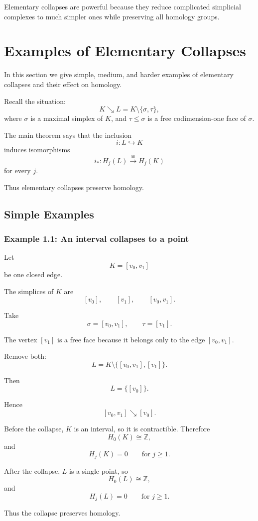 \documentclass[12pt,a4paper]{article}
\theoremstyle{notespace}
\begin{document}
Elementary collapses are powerful because they reduce complicated simplicial complexes to much simpler ones while preserving all homology groups.

\section{Examples of Elementary Collapses}

In this section we give simple, medium, and harder examples of elementary collapses and their effect on homology.

Recall the situation:
\[
K\searrow L=K\setminus\{\sigma,\tau\},
\]
where \(\sigma\) is a maximal simplex of \(K\), and \(\tau\leq \sigma\) is a free codimension-one face of \(\sigma\).

The main theorem says that the inclusion
\[
i\colon L\hookrightarrow K
\]
induces isomorphisms
\[
i_*\colon H_j(L)\xrightarrow{\cong}H_j(K)
\]
for every \(j\).

Thus elementary collapses preserve homology.

\subsection{Simple Examples}

\subsubsection{Example 1.1: An interval collapses to a point}

Let
\[
K=[v_0,v_1]
\]
be one closed edge.

The simplices of \(K\) are
\[
[v_0],\qquad [v_1],\qquad [v_0,v_1].
\]

Take
\[
\sigma=[v_0,v_1],
\qquad
\tau=[v_1].
\]

The vertex \([v_1]\) is a free face because it belongs only to the edge \([v_0,v_1]\).

Remove both:
\[
L=K\setminus\{[v_0,v_1],[v_1]\}.
\]

Then
\[
L=\{[v_0]\}.
\]

Hence
\[
[v_0,v_1]\searrow [v_0].
\]

Before the collapse, \(K\) is an interval, so it is contractible. Therefore
\[
H_0(K)\cong \mathbb Z,
\]
and
\[
H_j(K)=0
\qquad
\text{for }j\geq 1.
\]

After the collapse, \(L\) is a single point, so
\[
H_0(L)\cong \mathbb Z,
\]
and
\[
H_j(L)=0
\qquad
\text{for }j\geq 1.
\]

Thus the collapse preserves homology.
\end{document}
